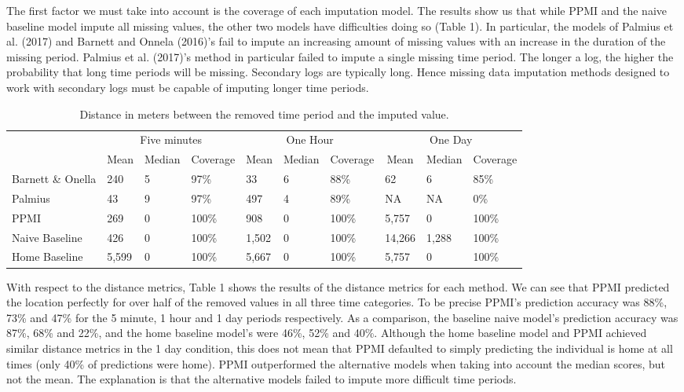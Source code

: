 \documentclass[man]{apa6}
\makeatletter
\newenvironment{lltable}
  {\begin{landscape}\begin{center}\begin{ThreePartTable}}
  {\end{ThreePartTable}\end{center}\end{landscape}}
\newcommand\LastLTentrywidth{1em}
\newlength\longtablewidth
\newcommand\getlongtablewidth{%
 \begingroup
  \ifcsname LT@\roman{LT@tables}\endcsname
  \global\longtablewidth=0pt
  \renewcommand\LT@entry[2]{\global\advance\longtablewidth by ##2\relax\gdef\LastLTentrywidth{##2}}%
  \@nameuse{LT@\roman{LT@tables}}%
  \fi
\endgroup}
\theoremstyle{definition}
\theoremstyle{definition}
\theoremstyle{definition}
\theoremstyle{remark}
\makeatother
\begin{document}
The first factor we must take into account is the coverage of each
imputation model. The results show us that while PPMI and the naive
baseline model impute all missing values, the other two models have
difficulties doing so (Table 1). In particular, the models of Palmius et
al. (2017) and Barnett and Onnela (2016)'s fail to impute an increasing
amount of missing values with an increase in the duration of the missing
period. Palmius et al. (2017)'s method in particular failed to impute a
single missing time period. The longer a log, the higher the probability
that long time periods will be missing. Secondary logs are typically
long. Hence missing data imputation methods designed to work with
secondary logs must be capable of imputing longer time periods.

\begin{lltable}
\begin{longtable}{llllllllll}\noalign{\getlongtablewidth\global\LTcapwidth=\longtablewidth}
\caption{\label{tab:resulttable}Distance in meters between the removed time period and the imputed value.}\\
\toprule
 & \multicolumn{3}{c}{Five minutes} & \multicolumn{3}{c}{One Hour} & \multicolumn{3}{c}{One Day} \\
\cmidrule(r){2-4} \cmidrule(r){5-7} \cmidrule(r){8-10}
 & \multicolumn{1}{c}{Mean} & \multicolumn{1}{c}{Median} & \multicolumn{1}{c}{Coverage} & \multicolumn{1}{c}{Mean} & \multicolumn{1}{c}{Median} & \multicolumn{1}{c}{Coverage} & \multicolumn{1}{c}{Mean} & \multicolumn{1}{c}{Median} & \multicolumn{1}{c}{Coverage}\\
\midrule
Barnett \& Onella & 240 & 5 & 97\% & 33 & 6 & 88\% & 62 & 6 & 85\%\\
Palmius & 43 & 9 & 97\% & 497 & 4 & 89\% & NA & NA & 0\%\\
PPMI & 269 & 0 & 100\% & 908 & 0 & 100\% & 5,757 & 0 & 100\%\\
Naive Baseline & 426 & 0 & 100\% & 1,502 & 0 & 100\% & 14,266 & 1,288 & 100\%\\
Home Baseline & 5,599 & 0 & 100\% & 5,667 & 0 & 100\% & 5,757 & 0 & 100\%\\
\bottomrule
\end{longtable}
\end{lltable}

With respect to the distance metrics, Table 1 shows the results of the
distance metrics for each method. We can see that PPMI predicted the
location perfectly for over half of the removed values in all three time
categories. To be precise PPMI's prediction accuracy was 88\%, 73\% and
47\% for the 5 minute, 1 hour and 1 day periods respectively. As a
comparison, the baseline naive model's prediction accuracy was 87\%,
68\% and 22\%, and the home baseline model's were 46\%, 52\% and 40\%.
Although the home baseline model and PPMI achieved similar distance
metrics in the 1 day condition, this does not mean that PPMI defaulted
to simply predicting the individual is home at all times (only 40\% of
predictions were home). PPMI outperformed the alternative models when
taking into account the median scores, but not the mean. The explanation
is that the alternative models failed to impute more difficult time
periods.
\end{document}
